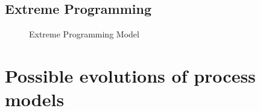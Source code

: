 \documentclass{style/CRPITStyle}
\renewcommand{\cite}{\citep}
\begin{document}
\subsection{Extreme Programming} %

\cite{dalalah:2014:xp}
\cite{khramtchenko:2004:xp}

\begin{figure}[htb]
\caption{\protect\label{iid} Extreme Programming Model}
\end{figure}


\paragraph{}

\section{Possible evolutions of process models}




\end{document}
